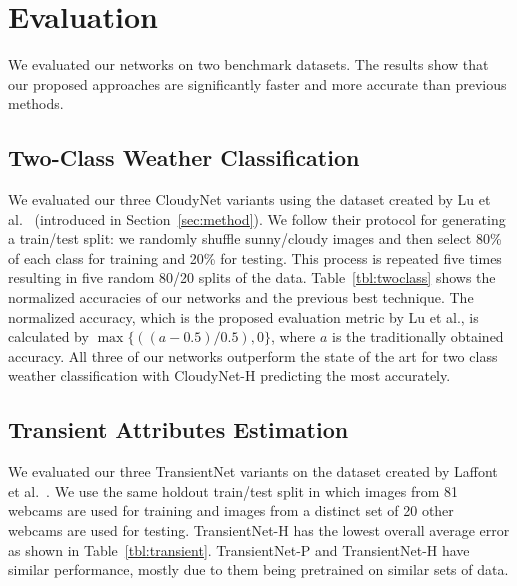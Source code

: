 \documentclass[10pt,twocolumn,letterpaper]{article}
\newcommand{\tblref}[1]{Table~\ref{tbl:#1}}
\begin{document}
\section{Evaluation}

We evaluated our networks on two benchmark datasets. The results show
that our proposed approaches are significantly faster and more
accurate than previous methods. 

\subsection{Two-Class Weather Classification}

We evaluated our three CloudyNet variants using the dataset created by Lu et
al.~\cite{lutwoclass} (introduced in Section~\ref{sec:method}). 
We follow their protocol for
generating a train/test split: we randomly shuffle sunny/cloudy images
and then select 80\% of each class for training and 20\% for testing.
This process is repeated five times resulting in five random 80/20
splits of the data. 
\tblref{twoclass} shows the normalized accuracies of our networks and
the previous best technique.  The normalized
accuracy, which is the proposed evaluation metric by Lu et al., is calculated by $ \max\{((a - 0.5) / 0.5), 0\} $, where $a$ is the
traditionally obtained accuracy. All three of our networks outperform the state
of the art for two class weather classification with CloudyNet-H predicting the
most accurately.


\subsection{Transient Attributes Estimation}

We evaluated our three TransientNet variants on the dataset created by Laffont
et al.~\cite{Laffont14}.  We use the same holdout train/test split in which
images from 81 webcams are used for training and images from a distinct set of
20 other webcams are used for testing. 
TransientNet-H has the lowest overall average error as shown in
\tblref{transient}.  TransientNet-P and TransientNet-H have similar
performance, mostly due to them being pretrained on similar sets of data.
\end{document}
